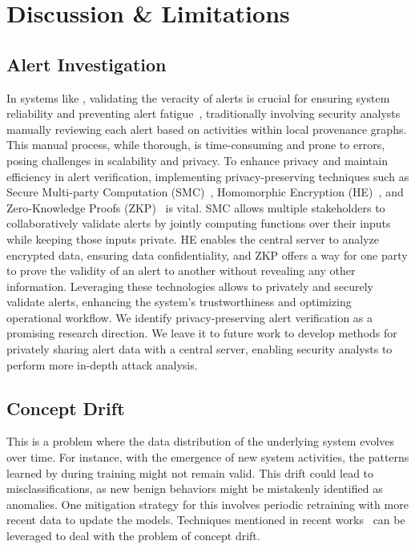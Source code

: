 \section{Discussion \& Limitations}
\label{sec:discussion}






\subsection{Alert Investigation} In systems like \Sys, validating the veracity of alerts is crucial for ensuring system reliability and preventing alert fatigue~\cite{nodoze2019}, traditionally involving security analysts manually reviewing each alert based on activities within local provenance graphs. This manual process, while thorough, is time-consuming and prone to errors, posing challenges in scalability and privacy. To enhance privacy and maintain efficiency in alert verification, implementing privacy-preserving techniques such as Secure Multi-party Computation (SMC)~\cite{goldreich1998secure}, Homomorphic Encryption (HE)~\cite{yi2014homomorphic}, and Zero-Knowledge Proofs (ZKP)~\cite{fiege1987zero} is vital. SMC allows multiple stakeholders to collaboratively validate alerts by jointly computing functions over their inputs while keeping those inputs private. HE enables the central server to analyze encrypted data, ensuring data confidentiality, and ZKP offers a way for one party to prove the validity of an alert to another without revealing any other information. Leveraging these technologies allows \Sys to privately and securely validate alerts, enhancing the system's trustworthiness and optimizing operational workflow. We identify privacy-preserving alert verification as a promising research direction. We leave it to future work to develop methods for privately sharing alert data with a central server, enabling security analysts to perform more in-depth attack analysis.


\subsection{Concept Drift} This is a problem where the data distribution of the underlying system evolves over time. For instance, with the emergence of new system activities, the patterns learned by \Sys during training might not remain valid. This drift could lead to misclassifications, as new benign behaviors might be mistakenly identified as anomalies. One mitigation strategy for this involves periodic retraining with more recent data to update the models. Techniques mentioned in recent works~\cite{lu2018learning, barbero2022transcending,jordaney2017transcend} can be leveraged to deal with the problem of concept drift.

